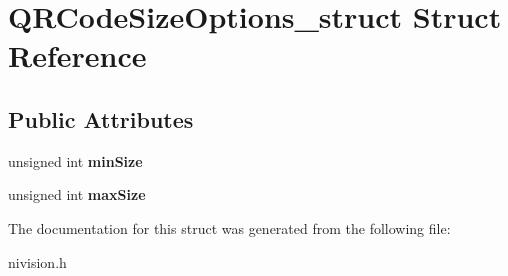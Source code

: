 \hypertarget{structQRCodeSizeOptions__struct}{\section{\-Q\-R\-Code\-Size\-Options\-\_\-struct \-Struct \-Reference}
\label{structQRCodeSizeOptions__struct}
}
\subsection*{\-Public \-Attributes}
\begin{DoxyCompactItemize}
\item 
\hypertarget{structQRCodeSizeOptions__struct_ad092cdc368cf5cdfa3e61ac6b1adf22e}{unsigned int {\bfseries min\-Size}}\label{structQRCodeSizeOptions__struct_ad092cdc368cf5cdfa3e61ac6b1adf22e}

\item 
\hypertarget{structQRCodeSizeOptions__struct_a29986d1d14ef9387e3aa9b5843150116}{unsigned int {\bfseries max\-Size}}\label{structQRCodeSizeOptions__struct_a29986d1d14ef9387e3aa9b5843150116}

\end{DoxyCompactItemize}


\-The documentation for this struct was generated from the following file\-:\begin{DoxyCompactItemize}
\item 
nivision.\-h\end{DoxyCompactItemize}
